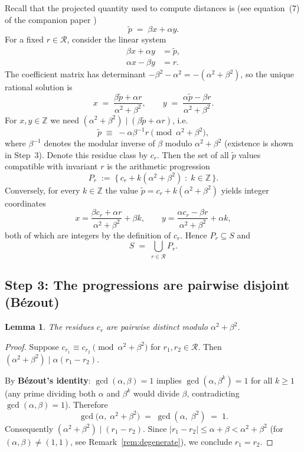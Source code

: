 \documentclass[11pt]{article}
\theoremstyle{plain}
\newtheorem{lemma}{Lemma}
\theoremstyle{remark}
\begin{document}
Recall that the projected quantity used to compute distances is (see equation~(7) of
the companion paper \cite{Kunert2025})
\[
    \tilde{p} \;=\; \beta x + \alpha y.
\]
For a fixed $r \in \mathcal{R}$, consider the linear system
\begin{align}
    \beta x + \alpha y &= \tilde{p}, \label{eq:sys1}\\
    \alpha x - \beta y &= r. \label{eq:sys2}
\end{align}
The coefficient matrix has determinant $-\beta^2 - \alpha^2 = -(\alpha^2+\beta^2)$,
so the unique rational solution is
\[
    x \;=\; \frac{\beta \tilde{p} + \alpha r}{\alpha^2+\beta^2}, \qquad
    y \;=\; \frac{\alpha \tilde{p} - \beta r}{\alpha^2+\beta^2}.
\]
For $x, y \in \mathbb{Z}$ we need $(\alpha^2+\beta^2) \mid (\beta\tilde{p} + \alpha r)$, i.e.
\[
    \tilde{p} \;\equiv\; -\alpha\beta^{-1} r \pmod{\alpha^2+\beta^2},
\]
where $\beta^{-1}$ denotes the modular inverse of $\beta$ modulo $\alpha^2+\beta^2$
(existence is shown in Step~3). Denote this residue class by $c_r$. Then the set
of all $\tilde{p}$ values compatible with invariant $r$ is the arithmetic progression
\[
    P_r \;:=\; \bigl\{\,c_r + k(\alpha^2+\beta^2) \;:\; k \in \mathbb{Z}\,\bigr\}.
\]
Conversely, for every $k \in \mathbb{Z}$ the value $\tilde{p} = c_r + k(\alpha^2+\beta^2)$
yields integer coordinates
\[
    x = \frac{\beta c_r + \alpha r}{\alpha^2+\beta^2} + \beta k, \qquad
    y = \frac{\alpha c_r - \beta r}{\alpha^2+\beta^2} + \alpha k,
\]
both of which are integers by the definition of $c_r$. Hence $P_r \subseteq S$ and
\[
    S \;=\; \bigcup_{r \in \mathcal{R}} P_r.
\]

\subsection*{Step 3: The progressions are pairwise disjoint (Bézout)}

\begin{lemma}
The residues $c_r$ are pairwise distinct modulo $\alpha^2+\beta^2$.
\end{lemma}

\begin{proof}
Suppose $c_{r_1} \equiv c_{r_2} \pmod{\alpha^2+\beta^2}$ for $r_1, r_2 \in \mathcal{R}$.
Then $(\alpha^2+\beta^2) \mid \alpha(r_1 - r_2)$.

By \textbf{Bézout's identity}: $\gcd(\alpha, \beta) = 1$ implies
$\gcd(\alpha, \beta^k) = 1$ for all $k \geq 1$ (any prime dividing both $\alpha$
and $\beta^k$ would divide $\beta$, contradicting $\gcd(\alpha,\beta)=1$).
Therefore
\[
    \gcd\!\bigl(\alpha,\; \alpha^2+\beta^2\bigr) \;=\; \gcd(\alpha,\; \beta^2) \;=\; 1.
\]
Consequently $(\alpha^2+\beta^2) \mid (r_1 - r_2)$.
Since $|r_1 - r_2| \leq \alpha + \beta < \alpha^2 + \beta^2$
(for $(\alpha, \beta) \neq (1,1)$, see Remark~\ref{rem:degenerate}),
we conclude $r_1 = r_2$.
\end{proof}
\end{document}
